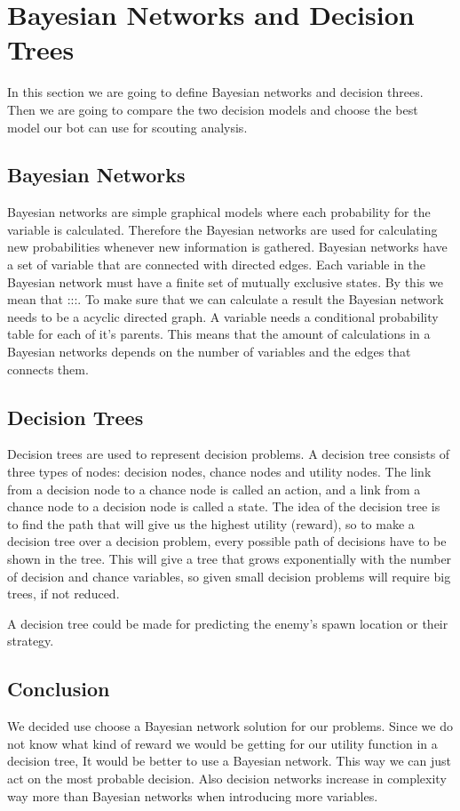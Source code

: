 \section{Bayesian Networks and Decision Trees}
In this section we are going to define Bayesian networks and decision threes. Then we are going to compare the two decision models and choose the best model our bot can use for scouting analysis.

\subsection{Bayesian Networks}
	Bayesian networks are simple graphical models where each probability for the variable is calculated. Therefore the Bayesian networks are used for calculating new probabilities whenever new information is gathered. Bayesian networks have a  set of variable that are connected with directed edges. Each variable in the Bayesian network must have a finite set of mutually exclusive states. By this we mean that :::. To make sure that we can calculate a result the Bayesian network needs to be a acyclic directed graph. A variable needs a conditional probability table for each of it's parents. This means that the amount of calculations in a Bayesian networks depends on the number of variables and the	edges that connects them. 

\subsection{Decision Trees}
Decision trees are used to represent decision problems. A decision tree consists of three types of nodes: decision nodes, chance nodes and utility nodes. The link from a decision node to a chance node is called an action, and a link from a chance node to a decision node is called a state. The idea of the decision tree is to find the path that will give us the highest utility (reward), so to make a decision tree over a decision problem, every possible path of decisions have to be shown in the tree. This will give a tree that grows exponentially with the number of decision and chance variables, so given small decision problems will require big trees, if not reduced. 
	
A decision tree could be made for predicting the enemy's spawn location or their strategy. 
	
\subsection{Conclusion}
We decided use choose a Bayesian network solution for our problems. Since we do not know what kind of reward we would be getting for our utility function in a decision tree, It would be better to use a Bayesian network. This way we can just act on the most probable decision. Also decision networks increase in complexity way more than Bayesian networks when introducing more variables.